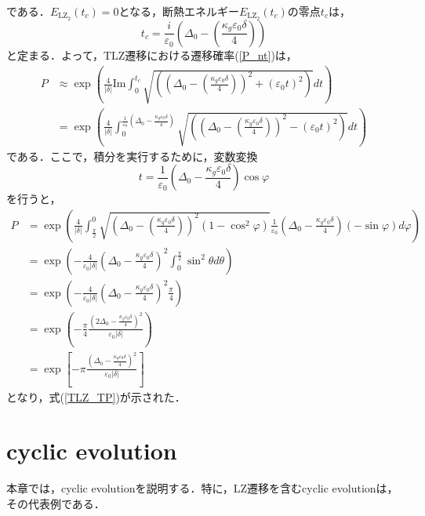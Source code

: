 \documentclass[a4paper, titlepage]{jsreport}
\begin{document}
である．$E_{\mathrm{LZ}_2}(t_c) = 0$となる，断熱エネルギー$E_{\mathrm{LZ}_2}(t_c)$の零点$t_c$は，
\begin{equation}
  t_c = \frac{i}{\varepsilon_0} \left( \Delta_0 - \left(\frac{\kappa_g \varepsilon_0 \delta}{4}\right) \right)
\end{equation}
と定まる．よって，TLZ遷移における遷移確率(\ref{P_nt})は，
\begin{align}
  P
  &\approx \exp \left(\frac{4}{|\delta|} \mathrm{Im} \int_0^{t_c} \sqrt{\left( \left( \Delta_0 - \left(\frac{\kappa_g \varepsilon_0 \delta }{4}\right) \right)^2 + (\varepsilon_0 t)^2 \right)} dt \right)\\
  &= \exp \left(\frac{4}{|\delta|} \int_0^{\frac{1}{\varepsilon_0} (\Delta_0 - \frac{\kappa_g \varepsilon_0 \delta}{4})} \sqrt{\left( \left( \Delta_0 - \left(\frac{\kappa_g \varepsilon_0 \delta}{4} \right)\right)^2 - (\varepsilon_0 t)^2 \right)} dt \right)
\end{align}
である．ここで，積分を実行するために，変数変換
\begin{equation}
  t = \frac{1}{\varepsilon_0} \left(\Delta_0 - \frac{\kappa_g \varepsilon_0 \delta}{4} \right) \cos \varphi
\end{equation}
を行うと，
\begin{align}
  P
  &= \exp \left(\frac{4}{|\delta|} \int_{\frac{\pi}{2}}^0 \sqrt{\left(\Delta_0 - \left(\frac{\kappa_g \varepsilon_0 \delta}{4}\right) \right)^2 (1-\cos^2\varphi)} \frac{1}{\varepsilon_0} \left( \Delta_0 - \frac{\kappa_g \varepsilon_0 \delta}{4} \right) (-\sin \varphi) d\varphi \right)\\
  &= \exp \left(-\frac{4}{\varepsilon_0 |\delta|} \left(\Delta_0 - \frac{\kappa_g \varepsilon_0 \delta}{4} \right) ^2\int_0^{\frac{\pi}{2}} \sin^2\theta d\theta \right)\\
  &= \exp \left(-\frac{4}{\varepsilon_0 |\delta|} \left(\Delta_0 - \frac{\kappa_g \varepsilon_0 \delta}{4} \right) ^2 \frac{\pi}{4} \right)\\
  &= \exp \left(-\frac{\pi}{4} \frac{(2\Delta_0-\frac{\kappa_g \varepsilon_0 \delta}{4})^2}{\varepsilon_0 |\delta|} \right)\\
  &= \exp \left[-\pi \frac{(\Delta_0 -\frac{\kappa_g \varepsilon_0 \delta}{4})^2}{\varepsilon_0 |\delta|}\right]
\end{align}
となり，式(\ref{TLZ_TP})が示された．


\chapter{cyclic evolution}\label{CE}
本章では，cyclic evolutionを説明する．特に，LZ遷移を含むcyclic evolutionは，その代表例である．
\end{document}
